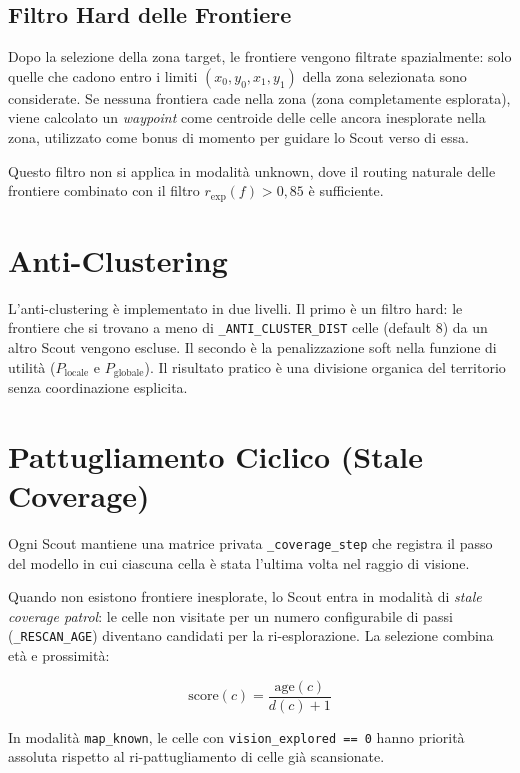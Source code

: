 \subsection{Filtro Hard delle Frontiere}

Dopo la selezione della zona target, le frontiere vengono filtrate spazialmente:
solo quelle che cadono entro i limiti $(x_0, y_0, x_1, y_1)$ della zona selezionata
sono considerate. Se nessuna frontiera cade nella zona (zona completamente esplorata),
viene calcolato un \textit{waypoint} come centroide delle celle ancora inesplorate
nella zona, utilizzato come bonus di momento per guidare lo Scout verso di essa.

Questo filtro non si applica in modalit\`a unknown, dove il routing naturale delle
frontiere combinato con il filtro $r_{\text{exp}}(f) > 0{,}85$ \`e sufficiente.

\section{Anti-Clustering}

L'anti-clustering \`e implementato in due livelli. Il primo \`e un filtro hard: le frontiere
che si trovano a meno di \texttt{\_ANTI\_CLUSTER\_DIST} celle (default 8) da un altro Scout
vengono escluse. Il secondo \`e la penalizzazione soft nella funzione di utilit\`a
($P_{\text{locale}}$ e $P_{\text{globale}}$). Il risultato pratico \`e una divisione
organica del territorio senza coordinazione esplicita.

\section{Pattugliamento Ciclico (Stale Coverage)}

Ogni Scout mantiene una matrice privata \texttt{\_coverage\_step} che registra il
passo del modello in cui ciascuna cella \`e stata l'ultima volta nel raggio di visione.

Quando non esistono frontiere inesplorate, lo Scout entra in modalit\`a di
\textit{stale coverage patrol}: le celle non visitate per un numero configurabile di
passi (\texttt{\_RESCAN\_AGE}) diventano candidati per la ri-esplorazione.
La selezione combina et\`a e prossimit\`a:

$$\text{score}(c) = \frac{\text{age}(c)}{d(c) + 1}$$

In modalit\`a \texttt{map\_known}, le celle con \texttt{vision\_explored == 0}
hanno priorit\`a assoluta rispetto al ri-pattugliamento di celle gi\`a scansionate.


